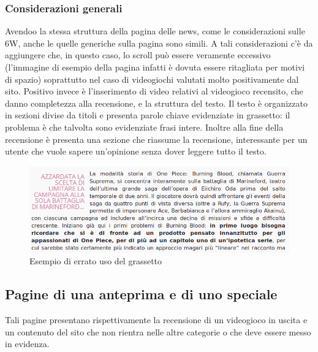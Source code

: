\documentclass[../ProgettoTecWeb2.tex]{subfiles}
\begin{document}
		\subsubsection{Considerazioni generali}
		Avendoo la stessa struttura della pagina delle news, come le considerazioni sulle 6W, anche le quelle generiche sulla pagina sono simili. A tali considerazioni c'è da aggiungere che, in questo caso, lo scroll può essere veramente eccessivo (l'immagine di esempio della pagina infatti è dovuta essere ritagliata per motivi di spazio) soprattutto nel caso di videogiochi valutati molto positivamente dal sito. Positivo invece è l'inserimento di video relativi al videogioco recensito, che danno completezza alla recensione, e la struttura del testo. Il testo è organizzato in sezioni divise da titoli e presenta parole chiave evidenziate in grassetto: il problema è che talvolta sono evidenziate frasi intere. Inoltre alla fine della recensione è presenta una sezione che riassume la recensione, interessante per un utente che vuole sapere un'opinione senza dover leggere tutto il testo.
		\begin{figure} [H]
			\centering
			\includegraphics[scale=0.4]{img/ErratoUsoGrassetto}
			\caption{Esempio di errato uso del grassetto}
		\end{figure}

	\subsection{Pagine di una anteprima e di uno speciale}
	Tali pagine presentano rispettivamente la recensione di un videogioco in uscita e un contenuto del sito che non rientra nelle altre categorie o che deve essere messo in evidenza.
\end{document}
